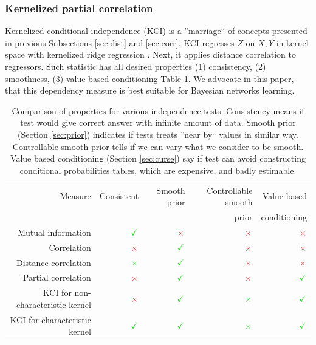 \documentclass{article} %
\begin{document}
\subsubsection{Kernelized partial correlation}\label{sec:kci}
Kernelized conditional independence (KCI) \cite{zhang2012kernel} is a ''marriage`` of concepts presented in 
previous Subsections \ref{sec:dist} and \ref{sec:corr}. KCI regresses $Z$ on $X, Y$ in kernel space with kernelized
ridge regression \cite{saunders1998ridge}. Next,
it applies distance correlation to regressors. Such statistic has all desired properties (1) consistency, (2) smoothness, 
(3) value based conditioning Table \ref{tab:compar}. We advocate in this paper, that this dependency measure
is best suitable for Bayesian networks learning. 


\begin{table}[t]
\centering
\tiny
\begin{tabular}{rrrrr}
\hline
Measure & Consistent & Smooth prior & Controllable smooth & Value based\\
& & & prior & conditioning\\
\hline
Mutual information & $\color{LimeGreen} \checkmark $ & $\color{Maroon}\times$ & $\color{Maroon}\times$ &   $\color{Maroon}\times$ \\
Correlation & $\color{Maroon}\times$  & $\color{LimeGreen} \checkmark $ & $\color{Maroon}\times$ & $\color{Maroon}\times$ \\
Distance correlation & $\color{LimeGreen}\times$  & $\color{LimeGreen} \checkmark $ & $\color{Maroon}\times$ & $\color{Maroon}\times$ \\
Partial correlation & $\color{Maroon}\times$  & $\color{LimeGreen} \checkmark $ & $\color{Maroon}\times$ & $\color{LimeGreen}\checkmark$ \\
KCI for non-characteristic kernel & $\color{Maroon}\times$  & $\color{LimeGreen} \checkmark $ & $\color{LimeGreen}\times$ & $\color{LimeGreen}\checkmark$ \\
KCI for characteristic kernel & $\color{LimeGreen}\checkmark$  & $\color{LimeGreen} \checkmark $ & $\color{LimeGreen}\times$ & $\color{LimeGreen}\checkmark$ \\
\hline
\end{tabular}
\caption{Comparison of properties for various independence tests. Consistency means if test would give correct answer with infinite amount of data. Smooth prior (Section \ref{sec:prior}) indicates if tests treats ''near by`` values in similar way. Controllable smooth prior tells if we can vary what we consider to be smooth. Value based conditioning (Section \ref{sec:curse}) say if test can avoid constructing conditional probabilities tables, which are expensive, and badly estimable.}
  
\label{tab:compar}
\end{table}
\end{document}
